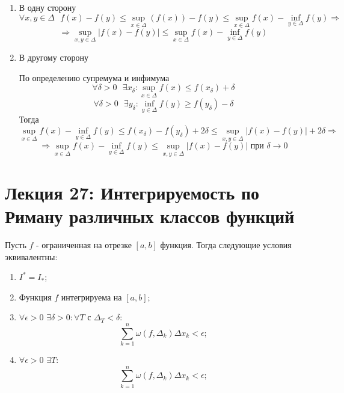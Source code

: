     \begin{explanation}
    	\begin{enumerate}
    		\item В одну сторону
    		\[ \forall x, y \in \Delta \text{ } f(x) - f(y) \leqslant \sup_{x \in \Delta} {(f(x))} - f(y) \leqslant \sup_{x \in \Delta} {f(x)} - \inf_{y \in \Delta} {f(y)} \Rightarrow \]
    		\[ \Rightarrow \sup_{x, y \in \Delta}{|f(x) - f(y)|} \leqslant \sup_{x \in \Delta}{f(x)} - \inf_{y \in \Delta}{f(y)} \] 
    		\item В другому сторону
    		
    		По определению супремума и инфимума
    		\[ \forall \delta > 0 \text{ } \exists x_{\delta}: \sup_{x \in \Delta} {f(x)} \leqslant f(x_{\delta}) + \delta \]
    		\[ \forall \delta > 0 \text{ } \exists y_{\delta}: \inf_{y \in \Delta} {f(y)} \geqslant f(y_{\delta}) - \delta \]
    		Тогда
    		\[ \sup_{x \in \Delta} {f(x)} - \inf_{y \in \Delta}{f(y)} \leqslant f(x_{\delta}) - f(y_{\delta}) + 2\delta \leqslant  \sup_{x, y \in \Delta} {|f(x) - f(y)|} + 2\delta \Rightarrow \]
    		\[ \Rightarrow \sup_{x \in \Delta} {f(x)} - \inf_{y \in \Delta}{f(y)} \leqslant  \sup_{x, y \in \Delta} {|f(x) - f(y)|} \text{ при } \delta \to 0 \]
    	\end{enumerate}
    \end{explanation}
    
    \section*{Лекция 27: Интегрируемость по Риману различных классов функций}
    
    \begin{theorem}
    	Пусть $f$ - ограниченная на отрезке $[a, b]$ функция. Тогда следующие условия эквивалентны:
    	\begin{enumerate}
    		\item $I^{*} = I_{*}$;
    		\item Функция $f$ интегрируема на $[a, b]$;
    		\item $\forall \epsilon > 0$ $\exists \delta > 0: \forall T$ с $\Delta_T < \delta:$
    		\[ \sum_{k = 1}^{n} \omega(f, \Delta_k) \Delta x_k < \epsilon; \]
    		\item $\forall \epsilon > 0$ $\exists T:$
    		\[ \sum_{k = 1}^{n} \omega(f, \Delta_k) \Delta x_k < \epsilon; \]
    	\end{enumerate}
    \end{theorem}
    
